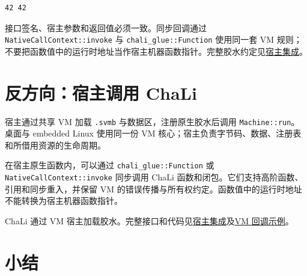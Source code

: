 \par
\medskip
\begin{lstlisting}[style=out]
42 42
\end{lstlisting}
\par
\medskip

接口签名、宿主参数和返回值必须一致。同步回调通过 \texttt{Native\allowbreak{}Call\allowbreak{}Context:\allowbreak{}:\allowbreak{}invoke} 与 \texttt{chali\_glue:\allowbreak{}:\allowbreak{}Function} 使用同一套 VM 规则；不要把函数值中的运行时地址当作宿主机器函数指针。完整胶水约定见\href{https://gitee.com/rabbitc999/chali/blob/master/doc/08-host-integration.md}{宿主集成}。

\section{反方向：宿主调用 ChaLi}

宿主通过共享 VM 加载 \texttt{.\allowbreak{}svmb} 与数据区，注册原生胶水后调用 \texttt{Machine:\allowbreak{}:\allowbreak{}run}。桌面与 embedded Linux 使用同一份 VM 核心；宿主负责字节码、数据、注册表和所借用资源的生命周期。

在宿主原生函数内，可以通过 \texttt{chali\_glue:\allowbreak{}:\allowbreak{}Function} 或 \texttt{Native\allowbreak{}Call\allowbreak{}Context:\allowbreak{}:\allowbreak{}invoke} 同步调用 ChaLi 函数和闭包。它们支持高阶函数、引用和同步重入，并保留 VM 的错误传播与所有权约定。函数值中的运行时地址不能转换为宿主机器函数指针。

ChaLi 通过 VM 宿主加载胶水。完整接口和代码见\href{https://gitee.com/rabbitc999/chali/blob/master/doc/08-host-integration.md}{宿主集成}及\href{https://gitee.com/rabbitc999/chali/blob/master/example/native-callbacks/README.md}{VM 回调示例}。

\section{小结}

